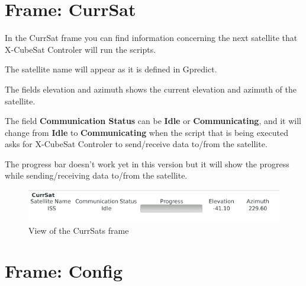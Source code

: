 \documentclass[pdftex,11pt,a4paper,titlepage]{report}
\begin{document}
\chapter{Frame: CurrSat}
\hspace{0.4cm} In the CurrSat frame you can find information concerning the next satellite that X-CubeSat Controler will run the scripts. 

The satellite name will appear as it is defined in Gpredict.

The fields elevation and azimuth shows the current elevation and azimuth of the satellite.

The field \textbf{Communication Status} can be \textbf{Idle} or \textbf{Communicating}, and it will change from \textbf{Idle} to \textbf{Communicating} when the script that is being executed asks for X-CubeSat Controler to send/receive data to/from the satellite.

The progress bar doesn't work yet in this version but it will show the progress while sending/receiving data to/from the satellite.
\begin{figure}[h]
\centering
\includegraphics[scale=0.7]{../images/CurrSatFrame.png}
\caption{View of the CurrSats frame}
\end{figure}

\chapter{Frame: Config}
\end{document}
